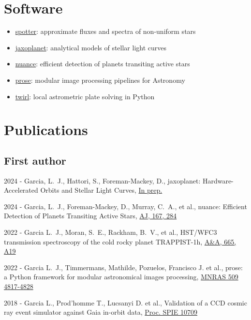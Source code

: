\documentclass[10pt,letterpaper]{article}
\newcommand{\publi}[4]{\item #1 - #3, #2, #4}
\newcommand{\aj}{AJ}
\newcommand{\aap}{A\&A}
\begin{document}
\section*{Software}
\begin{itemize}
    \item \textsf{\href{https://github.com/lgrcia/spotter}{spotter}}: approximate fluxes and spectra of non-uniform stars
    \item \textsf{\href{https://github.com/exoplanet-dev/jaxoplanet}{jaxoplanet}}: analytical models of stellar light curves
    \item \textsf{\href{https://github.com/lgrcia/nuance}{nuance}}: efficient detection of planets transiting active stars
    \item \textsf{\href{https://github.com/lgrcia/prose}{prose}}: modular image processing pipelines for Astronomy
    \item \textsf{\href{https://github.com/lgrcia/twirl}{twirl}}: local astrometric plate solving in Python 
\end{itemize}
\section*{Publications}
\subsection*{First author}

\begin{etaremune}
\publi{2024}{\textsf{jaxoplanet}: Hardware-Accelerated Orbits and Stellar Light Curves}
{Garcia, L.~J., Hattori, S., Foreman-Mackey, D.}
{\href{https://raw.githubusercontent.com/lgrcia/paper-jaxoplanet/main/latex/jaxoplanet_draft_20241017.pdf}{In prep.}}


\publi{2024}{\textsf{nuance}: Efficient Detection of Planets Transiting Active Stars}
{Garcia, L.~J., Foreman-Mackey, D., Murray, C.~A., et al.}
{\href{https://ui.adsabs.harvard.edu/abs/2024AJ....167..284G}{\aj, 167, 284}}

\publi{2022}{HST/WFC3 transmission spectroscopy of the cold rocky planet TRAPPIST-1h}
{Garcia L.~J., Moran, S.~E., Rackham, B.~V., et al.}
{\href{https://ui.adsabs.harvard.edu/abs/2022A\&A...665A..19G}{\aap, 665, A19}}

\publi{2022}{\textsf{prose}: a Python framework for modular astronomical images processing}
{Garcia L.~J., Timmermans, Mathilde, Pozuelos, Francisco J. et al.}
{\href{https://ui.adsabs.harvard.edu/abs/2022MNRAS.509.4817G/exportcitation}{MNRAS 509 4817-4828}}

\publi{2018}{Validation of a CCD cosmic ray event simulator against Gaia in-orbit data}
{Garcia L., Prod'homme T., Lucsanyi D. et al.}
{\href{http://doi.org/10.1117/12.2314090}{Proc. SPIE 10709}}

\end{etaremune}
\end{document}
